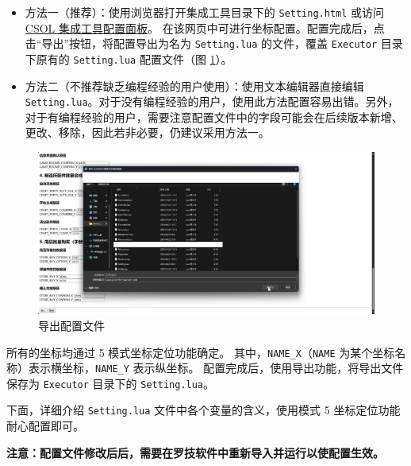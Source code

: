 \begin{itemize}
\item 方法一（推荐）：使用浏览器打开集成工具目录下的 \lstinline{Setting.html} 或访问 \href{https://macrohard.fun/CSOL-Utilities/Setting.html}{CSOL 集成工具配置面板}。 在该网页中可进行坐标配置。配置完成后，点击“导出”按钮，将配置导出为名为 \lstinline{Setting.lua} 的文件，覆盖 \lstinline{Executor} 目录下原有的 \lstinline{Setting.lua} 配置文件（图 \ref{ch2fig-export-setting}）。
\item 方法二（不推荐缺乏编程经验的用户使用）：使用文本编辑器直接编辑 \lstinline{Setting.lua}。对于没有编程经验的用户，使用此方法配置容易出错。另外，对于有编程经验的用户，需要注意配置文件中的字段可能会在后续版本新增、更改、移除，因此若非必要，仍建议采用方法一。
\end{itemize}

\begin{figure}[H]
    \Centering
    \includegraphics[width=\textwidth]{docs/assets/export_setting}
    \caption{导出配置文件}
    \label{ch2fig-export-setting}
\end{figure}

所有的坐标均通过 5 模式坐标定位功能确定。
其中，\lstinline{NAME_X}（\lstinline{NAME} 为某个坐标名称）表示横坐标，\lstinline{NAME_Y} 表示纵坐标。
配置完成后，使用导出功能，将导出文件保存为 \lstinline{Executor} 目录下的 \lstinline{Setting.lua}。

下面，详细介绍 \lstinline{Setting.lua} 文件中各个变量的含义，使用模式 5 坐标定位功能耐心配置即可。

\textbf{\color{red}注意：配置文件修改后后，需要在罗技软件中重新导入并运行以使配置生效。}

